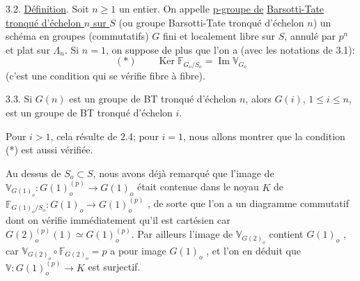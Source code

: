 
3.2. \uline{Définition}. Soit $n \geq 1$ un entier. On appelle \uline{p-groupe de}
\uline{Barsotti-Tate tronqué d'échelon $n$ sur $S$} (ou groupe Barsotti-Tate
tronqué d'échelon $n$) un schéma en groupes (commutatifs) $G$ fini et
localement libre sur $S$, annulé par $p^{n}$ et plat sur $\Lambda_{n}$. Si $n = 1$,
on suppose de plus que l'on a (avec les notations de 3.1):
\[
(*) \qquad \operatorname{Ker} \mathbb{F}_{G_{o}/S_{o}} = \operatorname{Im} \mathbb{V}_{G_{o}}
\]
(c'est une condition qui se vérifie fibre à fibre).

3.3. Si $G(n)$ est un groupe de BT tronqué d'échelon $n$, alors
$G(i)$, $1 \leq i \leq n$, est un groupe de BT tronqué d'échelon $i$.

Pour $i > 1$, cela résulte de 2.4; pour $i = 1$, nous allons
montrer que la condition (*) est aussi vérifiée.

Au dessus de $S_{o} \subset S$, nous avons déjà remarqué que l'image de
$\mathbb{V}_{G(1)_{o}} : G(1)_{o}^{(p)} \rightarrow G(1)_{o}$ était contenue dans le noyau $K$ de
$\mathbb{F}_{G(1)_{o}/S_{o}} : G(1)_{o} \rightarrow G(1)_{o}^{(p)}$ , de sorte que l'on a un diagramme commutatif
dont on vérifie immédiatement qu'il est cartésien car $G(2)_{o}^{(p)}(1) \simeq G(1)_{o}^{(p)}$.
Par ailleurs l'image de $\mathbb{V}_{G(2)_{o}}$ contient $G(1)_{o}$ , car
$\mathbb{V}_{G(2)_{o}} \circ \mathbb{F}_{G(2)_{o}} = p$ a pour image $G(1)_{o}$ , et l'on en déduit que
$\mathbb{V} : G(1)_{o}^{(p)} \rightarrow K$ est surjectif.


